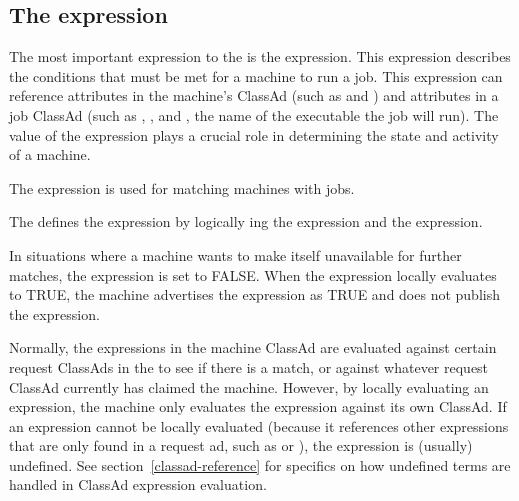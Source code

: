 

\subsection{\label{sec:Start-Expr}
The  expression}

The most important expression to the 
is the  expression.  
This expression describes the conditions that must be met for a
machine to run a job. 
This expression can reference attributes
in the machine's ClassAd (such as  and )
and attributes in a job ClassAd (such as
, , and , the name of the
executable the job will run).
The value of the  expression plays a crucial role in
determining the state and activity of a machine.

The  expression is used for
matching machines with jobs.

The  defines the
 expression by logically ing the 
 expression and the 
expression. 

In situations where a machine wants to make itself
unavailable for further matches, the 
expression is set to FALSE.  
When the  expression locally evaluates to TRUE, the
machine advertises the  expression as TRUE and
does not publish the  expression.

Normally, the expressions in the machine ClassAd are evaluated against
certain request ClassAds in the  to see if there is
a match, or against whatever request ClassAd currently has claimed the
machine.  However, by locally evaluating an expression, the machine only
evaluates the expression against its own ClassAd.  If an expression
cannot be locally evaluated (because it references other expressions
that are only found in a request ad, such as  or
), the expression is (usually) undefined.
See section~\ref{classad-reference} for specifics on
how undefined terms are handled in ClassAd expression evaluation. 

